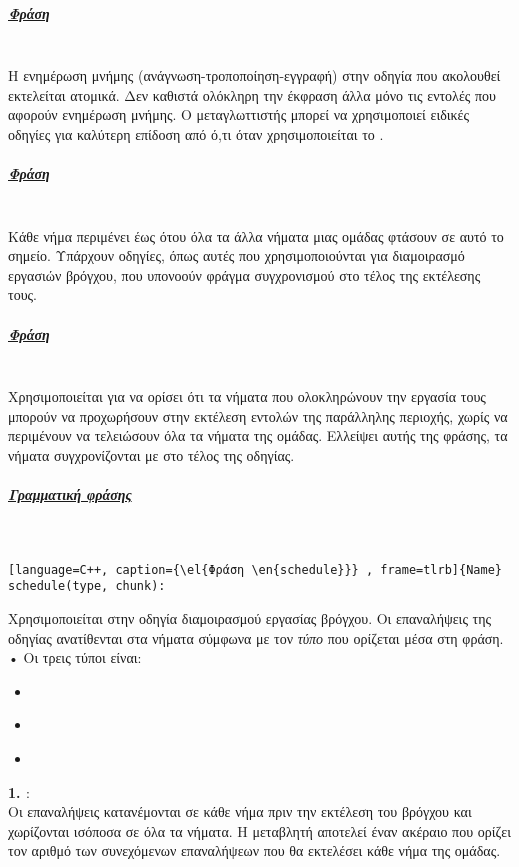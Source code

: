 \subparagraph{\underline{Φράση }}
\ \\
H ενημέρωση μνήμης (ανάγνωση-τροποποίηση-εγγραφή) στην οδηγία που ακολουθεί εκτελείται ατομικά. Δεν καθιστά ολόκληρη την
έκφραση \emph{} άλλα μόνο τις εντολές που αφορούν ενημέρωση μνήμης. Ο μεταγλωττιστής μπορεί να χρησιμοποιεί
ειδικές οδηγίες \emph{} για καλύτερη επίδοση από ό,τι όταν χρησιμοποιείται το \emph{}.


\subparagraph{\underline{Φράση }}
\ \\
Κάθε νήμα περιμένει έως ότου όλα τα άλλα νήματα μιας ομάδας φτάσουν σε αυτό το σημείο. Υπάρχουν οδηγίες, όπως αυτές που
χρησιμοποιούνται για διαμοιρασμό εργασιών βρόγχου, που υπονοούν φράγμα συγχρονισμού \emph{} στο τέλος της
εκτέλεσης τους.


\subparagraph{\underline{Φράση }}
\ \\
Χρησιμοποιείται για να ορίσει ότι τα νήματα που ολοκληρώνουν την εργασία τους μπορούν να προχωρήσουν στην εκτέλεση εντολών της παράλληλης περιοχής, χωρίς να περιμένουν να τελειώσουν όλα τα νήματα της ομάδας. Ελλείψει αυτής της φράσης, τα νήματα συγχρονίζονται με \emph{} στο τέλος της οδηγίας.
\subparagraph{\underline{Γραμματική φράσης }}
\ \\

\begin{lstlisting}[language=C++, caption={\el{Φράση \en{schedule}}} , frame=tlrb]{Name}
schedule(type, chunk): 
\end{lstlisting}

Χρησιμοποιείται στην οδηγία διαμοιρασμού εργασίας βρόγχου. Οι επαναλήψεις της οδηγίας ανατίθενται στα νήματα σύμφωνα με τον \emph{τύπο} που ορίζεται μέσα στη φράση.
•  Οι τρεις τύποι \emph{} είναι\cite{jakacorner}:
\begin{itemize}
\item{\emph{}}
\item{\emph{}}
\item{\emph{}}
\end{itemize}

\clearpage    

\textbf{1. \emph{}}:
\ \\
Οι επαναλήψεις κατανέμονται σε κάθε νήμα πριν την εκτέλεση του βρόγχου και χωρίζονται ισόποσα σε όλα τα νήματα. Η
μεταβλητή \emph{} αποτελεί έναν ακέραιο που ορίζει τον αριθμό των συνεχόμενων επαναλήψεων που θα εκτελέσει
κάθε νήμα της ομάδας.

